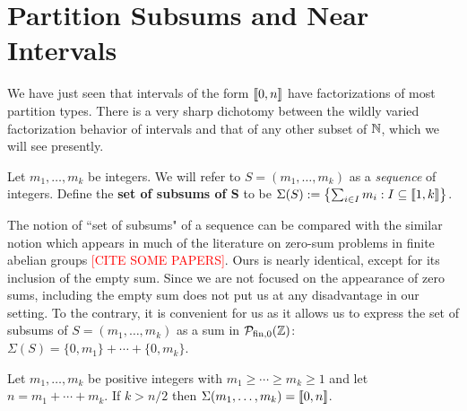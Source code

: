 \section{Partition Subsums and Near Intervals}
We have just seen that intervals of the form $\llbracket 0,n \rrbracket$ have factorizations of most partition types.
There is a very sharp dichotomy between the wildly varied factorization behavior of intervals and that of any other subset of $\mathbb{N}$, which we will see presently.  

\begin{defn}
	Let $m_1,\dots, m_k$ be integers.
	We will refer to $S = (m_1,\dots, m_k)$ as a \textit{sequence} of integers.
	Define the \textbf{set of subsums of S} to be $\Sigma(S) := \left\{ \sum_{i\in I} m_i : I\subseteq \llbracket 1,k \rrbracket \right\}$.
\end{defn}

\begin{rk}
	The notion of ``set of subsums" of a sequence can be compared with the similar notion which appears in much of the literature on zero-sum problems in finite abelian groups \textcolor{red}{[CITE SOME PAPERS]}.  
	Ours is nearly identical, except for its inclusion of the empty sum.
	Since we are not focused on the appearance of zero sums, including the empty sum does not put us at any disadvantage in our setting.
	To the contrary, it is convenient for us as it allows us to express the set of subsums of $S = (m_1,\dots, m_k)$ as a sum in $\mathcal{P}_{\textrm{fin}, 0}(\mathbb{Z})$: $\Sigma(S)  = \{0,m_1\} + \cdots +\{0,m_k\}$.
\end{rk}

\begin{lemma} \label{lem:long-partitions}
	Let $m_1,\dots, m_k$ be positive integers with $m_1\ge \cdots \ge m_k \ge 1$ and let $n = m_1 + \cdots + m_k$.
	If $k> n/2$ then $\Sigma(m_1,\dots, m_k) = \llbracket 0,n \rrbracket$.
\end{lemma}

